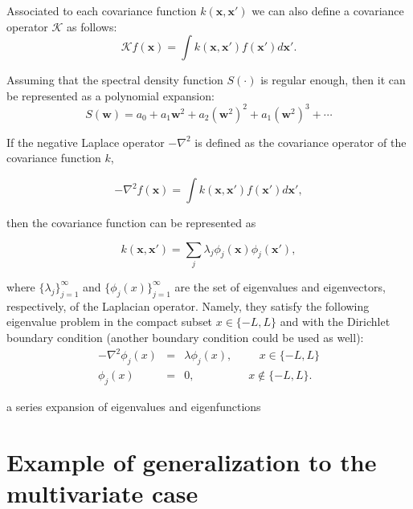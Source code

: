 \documentclass[]{interact}
\theoremstyle{plain}%
\theoremstyle{definition}
\theoremstyle{remark}
\begin{document}
Associated to each covariance function $k(\bm{x},\bm{x}')$ we can also define a covariance operator $\mathcal{K}$ as follows:
%
\begin{equation}
\mathcal{K} f(\bm{x}) = \int k(\bm{x},\bm{x}') f(\bm{x}') d\bm{x}'.
\end{equation} 

Assuming that the spectral density function $S(\cdot)$ is regular enough, then it can be represented as a polynomial expansion:
%
\begin{equation}
S(\bm{w})=a_0+a_1\bm{w}^2+a_2(\bm{w}^2)^2+a_1(\bm{w}^2)^3+\cdots
\end{equation}


If the negative Laplace operator $-\nabla^2$ is defined as the covariance operator of the covariance function $k$,

\begin{equation}
-\nabla^2 f(\bm{x}) = \int k(\bm{x},\bm{x}') f(\bm{x}') d\bm{x}',
\end{equation} 

\noindent then the covariance function can be represented as 

\begin{equation}
k(\bm{x},\bm{x}')= \sum_j \lambda_j \phi_j(\bm{x}) \phi_j(\bm{x}'),
\end{equation}

\noindent where $\{\lambda_j\}_{j=1}^{\infty}$ and $\{\phi_j(x)\}_{j=1}^{\infty}$ are the set of eigenvalues and eigenvectors, respectively, of the Laplacian operator. Namely, they satisfy the following eigenvalue problem in the compact subset $x \in \{-L,L\}$ and with the Dirichlet boundary condition (another boundary condition could be used as well):
%
\begin{eqnarray}
-\nabla^2 \phi_j(x)&=&\lambda \phi_j(x), \hspace{1cm}  x\in \{-L,L\} \nonumber \\ 
\phi_j(x)&=&0, \hspace{2cm} x\notin \{-L,L\}.
\end{eqnarray}  

a series expansion of eigenvalues and eigenfunctions 


\section{Example of generalization to the multivariate case}
\end{document}

